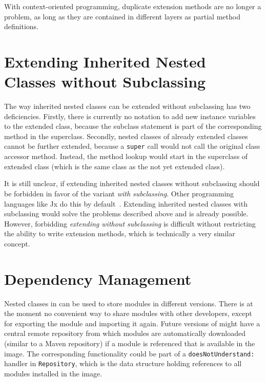 With context-oriented programming, duplicate extension methods are no longer a problem, as long as they are contained in different layers as partial method definitions.


\section{Extending Inherited Nested Classes without Subclassing}
The way inherited nested classes can be extended without subclassing has two deficiencies. Firstly, there is currently no notation to add new instance variables to the extended class, because the subclass statement is part of the corresponding method in the superclass. Secondly, nested classes of already extended classes cannot be further extended, because a \texttt{super} call would not call the original class accessor method. Instead, the method lookup would start in the superclass of extended class (which is the same class as the not yet extended class).

It is still unclear, if extending inherited nested classes without subclassing should be forbidden in favor of the variant \emph{with subclassing}. Other programming languages like Jx do this by default~\cite{Nystrom:2004:SEV:1028976.1028986}. Extending inherited nested classes with subclassing would solve the problems described above and is already possible. However, forbidding \emph{extending without subclassing} is difficult without restricting the ability to write extension methods, which is technically a very similar concept.

\section{Dependency Management}
Nested classes in \msname can be used to store modules in different versions. There is at the moment no convenient way to share modules with other developers, except for exporting the module and importing it again. Future versions of \msname might have a central remote repository from which modules are automatically downloaded (similar to a Maven repository) if a module is referenced that is available in the image. The corresponding functionality could be part of a \texttt{doesNotUnderstand:} handler in \texttt{Repository}, which is the data structure holding references to all modules installed in the image.

